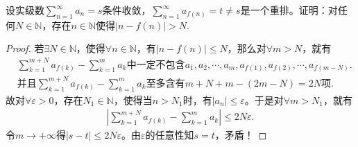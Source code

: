 \documentclass[../../main.tex]{subfiles}%
\begin{document}
\begin{example}
设实级数$\sum_{n=1}^{\infty} a_n = s$条件收敛，$\sum_{n=1}^{\infty} a_{f(n)} = t \neq s$是一个重排。证明：对任何$N \in \mathbb{N}$，存在$n \in \mathbb{N}$使得$|n - f(n)| > N$.
\end{example}
\begin{proof}
若$\exists N\in \mathbb{N}$，使得$\forall n\in \mathbb{N}$，有$\left| n-f\left( n \right) \right|\leqslant N$，那么对$\forall m>N$，就有
\begin{align*}
&\sum_{k=1}^{m+N}{a_{f\left( k \right)}}-\sum_{k=1}^m{a_k}\text{中一定不包含}a_1,a_2,\cdots ,a_m,a_{f\left( 1 \right)},a_{f\left( 2 \right)},\cdots ,a_{f\left( m-N \right)}.
\\
&\text{并且}\sum_{k=1}^{m+N}{a_{f\left( k \right)}}-\sum_{k=1}^m{a_k}\text{至多含有}m+N+m-\left( 2m-N \right) =2N\text{项}.
\end{align*}
故对$\forall \varepsilon >0$，存在$N_1\in \mathbb{N}$，使得当$n>N_1$时，有$\left| a_n \right|\leqslant \varepsilon$。于是对$\forall m>N_1$，就有
\begin{align*}
\left| \sum_{k=1}^{m+N}{a_{f\left( k \right)}}-\sum_{k=1}^m{a_k} \right|\leqslant 2N\varepsilon.
\end{align*}
令$m\rightarrow +\infty$得$\left| s-t \right|\leqslant 2N\varepsilon$。由$\varepsilon$的任意性知$s=t$，矛盾！
\end{proof}
\end{document}
